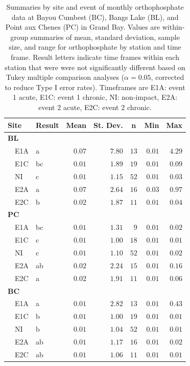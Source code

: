\documentclass[letterpaper,12pt]{article}\usepackage[]{graphicx}\usepackage[]{color}
\newcommand{\beginsupplement}{%
        \setcounter{table}{0}
        \renewcommand{\thetable}{S\arabic{table}}%
        \setcounter{figure}{0}
        \renewcommand{\thefigure}{S\arabic{figure}}%
     }
\begin{document}
\begin{table}[!tbp]
\caption{Summaries by site and event of monthly orthophosphate data at Bayou Cumbest (BC), Bangs Lake (BL), and Point aux Chenes (PC) in Grand Bay.  Values are within-group summaries of mean, standard deviation, sample size, and range for orthophosphate by station and time frame.  Result letters indicate time frames within each station that were were not significantly different based on Tukey multiple comparison analyses ($\alpha = 0.05$, corrected to reduce Type I error rates). Timeframes are E1A: event 1 acute, E1C: event 1 chronic, NI: non-impact, E2A: event 2 acute, E2C: event 2 chronic.\label{tab:orthtab}} 
\begin{center}
\begin{tabular}{llrrrrr}
\hline\hline
\multicolumn{1}{l}{Site}&\multicolumn{1}{c}{Result}&\multicolumn{1}{c}{Mean}&\multicolumn{1}{c}{St. Dev.}&\multicolumn{1}{c}{n}&\multicolumn{1}{c}{Min}&\multicolumn{1}{c}{Max}\tabularnewline
\hline
{\bfseries BL}&&&&&&\tabularnewline
~~E1A&a&$0.07$&$7.80$&$13$&$0.01$&$4.29$\tabularnewline
~~E1C&bc&$0.01$&$1.89$&$19$&$0.01$&$0.09$\tabularnewline
~~NI&c&$0.01$&$1.15$&$52$&$0.01$&$0.03$\tabularnewline
~~E2A&a&$0.07$&$2.64$&$16$&$0.03$&$0.97$\tabularnewline
~~E2C&b&$0.02$&$1.87$&$11$&$0.01$&$0.04$\tabularnewline
\hline
{\bfseries PC}&&&&&&\tabularnewline
~~E1A&bc&$0.01$&$1.31$&$ 9$&$0.01$&$0.02$\tabularnewline
~~E1C&c&$0.01$&$1.00$&$18$&$0.01$&$0.01$\tabularnewline
~~NI&c&$0.01$&$1.10$&$52$&$0.01$&$0.02$\tabularnewline
~~E2A&ab&$0.02$&$2.24$&$15$&$0.01$&$0.16$\tabularnewline
~~E2C&a&$0.02$&$1.91$&$11$&$0.01$&$0.06$\tabularnewline
\hline
{\bfseries BC}&&&&&&\tabularnewline
~~E1A&a&$0.01$&$2.82$&$13$&$0.01$&$0.43$\tabularnewline
~~E1C&b&$0.01$&$1.00$&$19$&$0.01$&$0.01$\tabularnewline
~~NI&b&$0.01$&$1.04$&$52$&$0.01$&$0.01$\tabularnewline
~~E2A&ab&$0.01$&$1.17$&$16$&$0.01$&$0.02$\tabularnewline
~~E2C&ab&$0.01$&$1.06$&$11$&$0.01$&$0.01$\tabularnewline
\hline
\end{tabular}\end{center}

\end{table}

\clearpage

\beginsupplement
\end{document}
